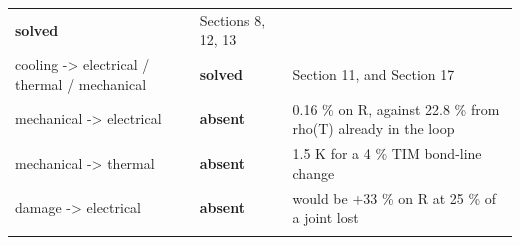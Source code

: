 \documentclass[10pt,]{article}
\begin{document}
\begin{longtable}[]{@{}lll@{}}
\begin{minipage}[t]{0.30\columnwidth}
\textbf{solved}\strut
\end{minipage} & \begin{minipage}[t]{0.30\columnwidth}\raggedright
Sections 8, 12, 13\strut
\end{minipage}\tabularnewline
\begin{minipage}[t]{0.30\columnwidth}\raggedright
cooling -\textgreater{} electrical / thermal / mechanical\strut
\end{minipage} & \begin{minipage}[t]{0.30\columnwidth}\raggedright
\textbf{solved}\strut
\end{minipage} & \begin{minipage}[t]{0.30\columnwidth}\raggedright
Section 11, and Section 17\strut
\end{minipage}\tabularnewline
\begin{minipage}[t]{0.30\columnwidth}\raggedright
mechanical -\textgreater{} electrical\strut
\end{minipage} & \begin{minipage}[t]{0.30\columnwidth}\raggedright
\textbf{absent}\strut
\end{minipage} & \begin{minipage}[t]{0.30\columnwidth}\raggedright
0.16 \% on R, against 22.8 \% from rho(T) already in the loop\strut
\end{minipage}\tabularnewline
\begin{minipage}[t]{0.30\columnwidth}\raggedright
mechanical -\textgreater{} thermal\strut
\end{minipage} & \begin{minipage}[t]{0.30\columnwidth}\raggedright
\textbf{absent}\strut
\end{minipage} & \begin{minipage}[t]{0.30\columnwidth}\raggedright
1.5 K for a 4 \% TIM bond-line change\strut
\end{minipage}\tabularnewline
\begin{minipage}[t]{0.30\columnwidth}\raggedright
damage -\textgreater{} electrical\strut
\end{minipage} & \begin{minipage}[t]{0.30\columnwidth}\raggedright
\textbf{absent}\strut
\end{minipage} & \begin{minipage}[t]{0.30\columnwidth}\raggedright
would be +33 \% on R at 25 \% of a joint lost\strut
\end{minipage}\tabularnewline
\begin{minipage}[t]{0.30\columnwidth}\raggedright

\end{minipage}
\end{longtable}
\end{document}
